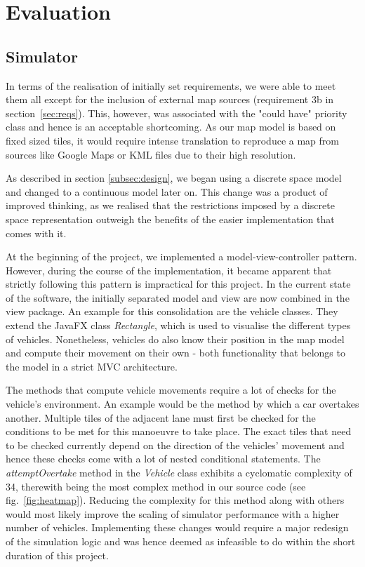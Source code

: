 \section{Evaluation}
\subsection{Simulator}\label{ss:eval_sim}
In terms of the realisation of initially set requirements, we were able to meet them all except for the inclusion of external map sources (requirement 3b in section~\ref{sec:reqs}). This, however, was associated with the "could have" priority class and hence is an acceptable shortcoming. As our map model is based on fixed sized tiles, it would require intense translation to reproduce a map from sources like Google Maps or KML files due to their high resolution. 

As described in section \ref{subsec:design}, we began using a discrete space model and changed to a continuous model later on. This change was a product of improved thinking, as we realised that the restrictions imposed by a discrete space representation outweigh the benefits of the easier implementation that comes with it.

At the beginning of the project, we implemented a model-view-controller pattern. However, during the course of the implementation, it became apparent that strictly following this pattern is impractical for this project. In the current state of the software, the initially separated model and view are now combined in the view package. An example for this consolidation are the vehicle classes. They extend the JavaFX class \textit{Rectangle}, which is used to visualise the different types of vehicles. Nonetheless, vehicles do also know their position in the map model and compute their movement on their own - both functionality that belongs to the model in a strict MVC architecture.

The methods that compute vehicle movements require a lot of checks for the vehicle's environment. An example would be the method by which a car overtakes another. Multiple tiles of the adjacent lane must first be checked for the conditions to be met for this manoeuvre to take place. The exact tiles that need to be checked currently depend on the direction of the vehicles' movement and hence these checks come with a lot of nested conditional statements. The \textit{attemptOvertake} method in the \textit{Vehicle} class exhibits a cyclomatic complexity of 34, therewith being the most complex method in our source code (see fig.~\ref{fig:heatmap}). Reducing the complexity for this method along with others would most likely improve the scaling of simulator performance with a higher number of vehicles. Implementing these changes would require a major redesign of the simulation logic and was hence deemed as infeasible to do within the short duration of this project.

